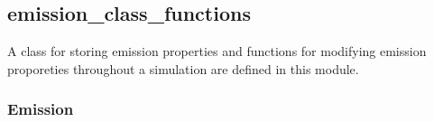 \documentclass[letterpaper,10pt,english]{sphinxmanual}
\begin{document}
\subsection{emission\_class\_functions}
\label{\detokenize{index:module-feast.EmissionSimModules.emission_class_functions}}\label{\detokenize{index:emission-class-functions}}
A class for storing emission properties and functions for modifying emission proporeties throughout a simulation are
defined in this module.


\subsubsection{Emission}
\label{\detokenize{index:emission}}
\end{document}
